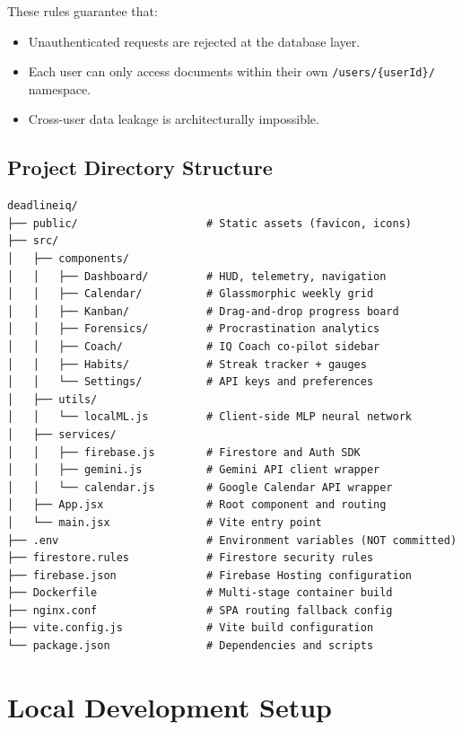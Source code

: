 \documentclass[12pt,a4paper]{report}
\begin{document}
These rules guarantee that:
\begin{itemize}[noitemsep]
  \item Unauthenticated requests are rejected at the database layer.
  \item Each user can only access documents within their own \texttt{/users/\{userId\}/} namespace.
  \item Cross-user data leakage is architecturally impossible.
\end{itemize}

\section{Project Directory Structure}

\begin{tcolorbox}[codebox]
\begin{lstlisting}[numbers=none]
deadlineiq/
├── public/                    # Static assets (favicon, icons)
├── src/
│   ├── components/
│   │   ├── Dashboard/         # HUD, telemetry, navigation
│   │   ├── Calendar/          # Glassmorphic weekly grid
│   │   ├── Kanban/            # Drag-and-drop progress board
│   │   ├── Forensics/         # Procrastination analytics
│   │   ├── Coach/             # IQ Coach co-pilot sidebar
│   │   ├── Habits/            # Streak tracker + gauges
│   │   └── Settings/          # API keys and preferences
│   ├── utils/
│   │   └── localML.js         # Client-side MLP neural network
│   ├── services/
│   │   ├── firebase.js        # Firestore and Auth SDK
│   │   ├── gemini.js          # Gemini API client wrapper
│   │   └── calendar.js        # Google Calendar API wrapper
│   ├── App.jsx                # Root component and routing
│   └── main.jsx               # Vite entry point
├── .env                       # Environment variables (NOT committed)
├── firestore.rules            # Firestore security rules
├── firebase.json              # Firebase Hosting configuration
├── Dockerfile                 # Multi-stage container build
├── nginx.conf                 # SPA routing fallback config
├── vite.config.js             # Vite build configuration
└── package.json               # Dependencies and scripts
\end{lstlisting}
\end{tcolorbox}

\chapter{Local Development Setup}
\label{ch:setup}
\end{document}

